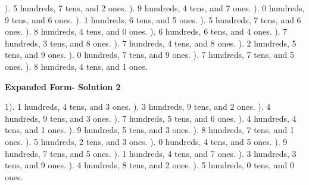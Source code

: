 \documentclass{article}%
\begin{document}
). 5 hundreds, 7 tens, and 2 ones.%
). 9 hundreds, 4 tens, and 7 ones.%
). 0 hundreds, 9 tens, and 6 ones.%
). 1 hundreds, 6 tens, and 5 ones.%
). 5 hundreds, 7 tens, and 6 ones.%
). 8 hundreds, 4 tens, and 0 ones.%
). 6 hundreds, 6 tens, and 4 ones.%
). 7 hundreds, 3 tens, and 8 ones.%
). 7 hundreds, 4 tens, and 8 ones.%
). 2 hundreds, 5 tens, and 9 ones.%
). 0 hundreds, 7 tens, and 9 ones.%
). 7 hundreds, 7 tens, and 5 ones.%
). 8 hundreds, 4 tens, and 1 ones.%
\newline%
\newpage%
\large%
\begin{center}%
\textbf{Expanded Form- Solution 2}%
\newline%
\end{center} \normalsize%
1). 1 hundreds, 4 tens, and 3 ones.%
). 3 hundreds, 9 tens, and 2 ones.%
). 4 hundreds, 9 tens, and 3 ones.%
). 7 hundreds, 5 tens, and 6 ones.%
). 4 hundreds, 4 tens, and 1 ones.%
). 9 hundreds, 5 tens, and 3 ones.%
). 8 hundreds, 7 tens, and 1 ones.%
). 5 hundreds, 2 tens, and 3 ones.%
). 0 hundreds, 4 tens, and 5 ones.%
). 9 hundreds, 7 tens, and 5 ones.%
). 1 hundreds, 4 tens, and 7 ones.%
). 3 hundreds, 3 tens, and 9 ones.%
). 4 hundreds, 8 tens, and 2 ones.%
). 5 hundreds, 0 tens, and 0 ones.%
\newline%
\end{document}
